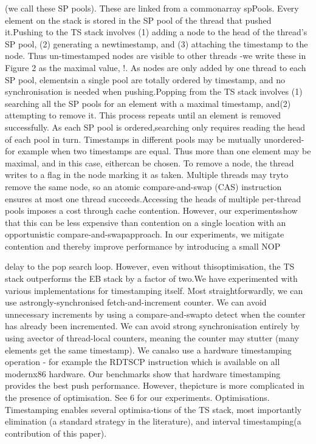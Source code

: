 (we call these SP pools). These are linked from a commonarray spPools. Every element on the stack is stored in the
SP pool of the thread that pushed it.Pushing to the TS stack involves (1) adding a node to
the head of the thread's SP pool, (2) generating a newtimestamp, and (3) attaching the timestamp to the node.
Thus un-timestamped nodes are visible to other threads -we write these in Figure 2 as the maximal value, !. As nodes
are only added by one thread to each SP pool, elementsin a single pool are totally ordered by timestamp, and no
synchronisation is needed when pushing.Popping from the TS stack involves (1) searching all the
SP pools for an element with a maximal timestamp, and(2) attempting to remove it. This process repeats until an
element is removed successfully. As each SP pool is ordered,searching only requires reading the head of each pool in turn.
Timestamps in different pools may be mutually unordered- for example when two timestamps are equal. Thus more
than one element may be maximal, and in this case, eithercan be chosen. To remove a node, the thread writes to a flag
in the node marking it as taken. Multiple threads may tryto remove the same node, so an atomic compare-and-swap
(CAS) instruction ensures at most one thread succeeds.Accessing the heads of multiple per-thread pools imposes
a cost through cache contention. However, our experimentsshow that this can be less expensive than contention on
a single location with an opportunistic compare-and-swapapproach. In our experiments, we mitigate contention and
thereby improve performance by introducing a small NOP

delay to the pop search loop. However, even without thisoptimisation, the TS stack outperforms the EB stack by a
factor of two.We have experimented with various implementations for
timestamping itself. Most straightforwardly, we can use astrongly-synchronised fetch-and-increment counter. We can
avoid unnecessary increments by using a compare-and-swapto detect when the counter has already been incremented.
We can avoid strong synchronisation entirely by using avector of thread-local counters, meaning the counter may
stutter (many elements get the same timestamp). We canalso use a hardware timestamping operation - for example the RDTSCP instruction which is available on all modernx86 hardware. Our benchmarks show that hardware timestamping provides the best push performance. However, thepicture is more complicated in the presence of optimisation.
See 6 for our experiments.
Optimisations. Timestamping enables several optimisa-tions of the TS stack, most importantly elimination (a standard strategy in the literature), and interval timestamping(a contribution of this paper).

